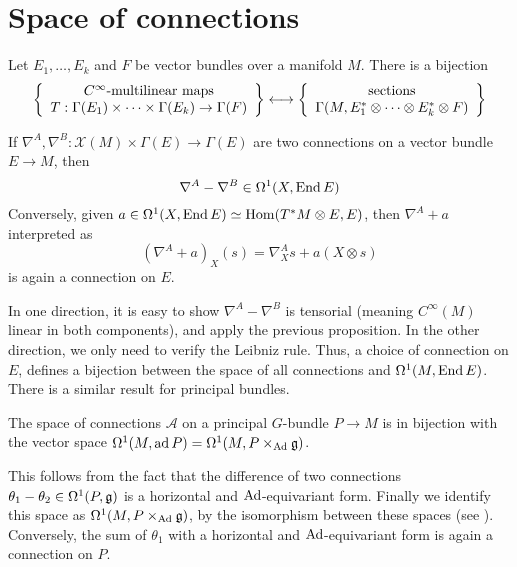 \section{Space of connections}
\begin{prop}
	Let $E_1,\ldots,E_k$ and $F$ be vector bundles over a manifold  $M$. 
	There is a bijection
	\[
	\set{
		\begin{array}{c}
			C^\infty\text{-multilinear maps} \\
			T:\Gamma(E_1)\times \cdots \times \Gamma(E_k) \to \Gamma(F)
		\end{array}
	} \longleftrightarrow
	\set{
		\begin{array}{c}
			\text{sections}\\
			  \Gamma(M,E_1^*\otimes \cdots \otimes E_k^*\otimes F)
		
		\end{array}
	}
	\] 
\end{prop}
\begin{prop}
	If $\nabla^A,\nabla^B : \mathcal{X}(M) \times \Gamma(E) \to \Gamma(E)$ are
	two connections on a vector bundle $E\to M$, then 
	 \[
	\nabla^A - \nabla^B \in \Omega^1(X,\operatorname{End} E)
	\] 
	Conversely, given $a\in \Omega^1(X,\operatorname{End} E) \simeq \operatorname{Hom}(T^*M\otimes E,E)$, 
	then $\nabla^A+a$ interpreted as 
	\[
		(\nabla^A + a)_X(s) = \nabla^A_X s + a(X\otimes s)
	\] 
	is again a connection on  $E$. 
\end{prop}
In one direction, it is easy to show $\nabla^A-\nabla^B$ is tensorial (meaning
$C^\infty(M)$ linear in both components), and apply the previous proposition. In the other
direction, we only need to verify the Leibniz rule. Thus, a choice of connection
on $E$, defines a bijection between the space of all connections and
$\Omega^1(M,\operatorname{End} E)$. There is a similar result for principal bundles.

\begin{prop} \label{prop:connection_space}%
	The space of connections $\mathcal{A}$ on a principal $G$-bundle $P\to M$ is in bijection 
	with the vector space $\Omega^1(M,\operatorname{ad} P) = \Omega^1(M,P\times_{\operatorname{Ad}} \mathfrak{g})$.
\end{prop}
This follows from the fact that the difference of two connections
$\theta_1-\theta_2\in \Omega^1(P,\operatorname{\mathfrak{g}})$ is a horizontal and $\operatorname{Ad}$-equivariant form.
Finally we identify this space as $\Omega^1(M,P\times_{\operatorname{Ad}}\operatorname{\mathfrak{g}})$, by 
the isomorphism between these spaces (see \cite[Theorem 31.9]{loringtu}). 
Conversely, the sum of $\theta_1$ with 
a horizontal and $\operatorname{Ad}$-equivariant form is again a connection on  $P$.

